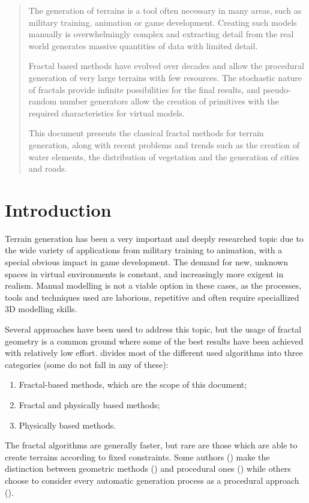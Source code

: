 \documentclass{acmtog}
\begin{document}
\begin{abstract} 
The generation of terrains is a tool often necessary in many areas, such as military training, animation or game development. Creating such models manually is overwhelmingly complex and extracting detail from the real world generates massive quantities of data with limited detail.

Fractal based methods have evolved over decades and allow the procedural generation of very large terrains with few resources. The stochastic nature of fractals provide infinite possibilities for the final results, and pseudo-random number generators allow the creation of primitives with the required characteristics for virtual models.

This document presents the classical fractal methods for terrain generation, along with recent problems and trends such as the creation of water elements, the distribution of vegetation and the generation of cities and roads.
\end{abstract}



\section{Introduction}
Terrain generation has been a very important and deeply researched topic due to the wide variety of applications from military training to animation, with a special obvious impact in game development. The demand for new, unknown spaces in virtual environments is constant, and increasingly more exigent in realism. Manual modelling is not a viable option in these cases, as the processes, tools and techniques used are laborious, repetitive and often require speciallized 3D modelling skills.

Several approaches have been used to address this topic, but the usage of fractal geometry is a common ground where some of the best results have been achieved with relatively low effort. \cite{Belhadj07} divides most of the different used algorithms into three categories (some do not fall in any of these):
\begin{enumerate}
\item{Fractal-based methods, which are the scope of this document;}
\item{Fractal and physically based methods;}
\item{Physically based methods.}
\end{enumerate}

The fractal algorithms are generally faster, but rare are those which are able to create terrains according to fixed constraints. Some authors (\cite{Belhadj07}) make the distinction between geometric methods (\cite{Mandelbrot83,Fournier82,Miller86}) and procedural ones (\cite{Perlin85}) while others choose to consider every automatic generation process as a procedural approach (\cite{Smelik09}).
\end{document}
